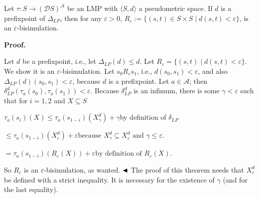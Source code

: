 Let $\tau:S\to(\mathcal{D}S)^{\mathcal{A}}$ be an LMP with $\langle S,d\rangle$ a pseudometric space. If $d$ is a prefixpoint of $\Delta_{LP}$, then for any $\varepsilon>0$, $R_{\varepsilon}:=\{(s,t)\in S\times S\mid d(s,t)<\varepsilon\}$, is an $\varepsilon$-bisimulation.\par
 
 
 
 
\par\medskip\noindent\textbf{Proof.}\par
 
 
Let $d$ be a prefixpoint, i.e., let $\Delta_{LP}(d)\leq d$. Let $R_{\varepsilon}=\{(s,t)\mid d(s,t)<\varepsilon\}$. We show it is an $\varepsilon$-bisimulation. Let $s_{0}R_{\varepsilon}s_{1}$, i.e., $d(s_{0},s_{1})<\varepsilon$, and also $\Delta_{LP}(d)(s_{0},s_{1})<\varepsilon$, because $d$ is a prefixpoint. Let $a\in\mathcal{A}$; then $\delta_{LP}^{d}(\tau_{a}(s_{0}),\tau_{a}(s_{1}))<\varepsilon$. Because $\delta_{LP}^{d}$ is an infimum, there is some $\gamma<\varepsilon$ such that for $i=1,2$ and $X\subseteq S$\par
  
\par  \quad  $\displaystyle\tau_{a}(s_{i})(X)$\quad  $\displaystyle\leq\tau_{a}(s_{1-i})(X^{d}_{\gamma})+\gamma$\quad  by definition of $\delta_{LP}$\quad  \quad  
 
\par  \quad  \quad  $\displaystyle\leq\tau_{a}(s_{1-i})(X^{d}_{\varepsilon})+\varepsilon$\quad  $\displaystyle\mbox{because }X^{d}_{\gamma}\subseteq X^{d}_{\varepsilon}\mbox{ and }\gamma\leq\varepsilon.$\quad  \quad  
 
\par  \quad  \quad  $\displaystyle=\tau_{a}(s_{1-i})(R_{\varepsilon}(X))+\varepsilon$\quad  $\displaystyle\mbox{by definition of }R_{\varepsilon}(X).$\quad  \quad  
  
So $R_{\varepsilon}$ is an $\varepsilon$-bisimulation, as wanted. $\hfill\blacktriangleleft$ The proof of this theorem needs that $X_{\varepsilon}^{d}$ be defined with a strict inequality. It is necessary for the existence of $\gamma$ (and for the last equality).\par
 
 
